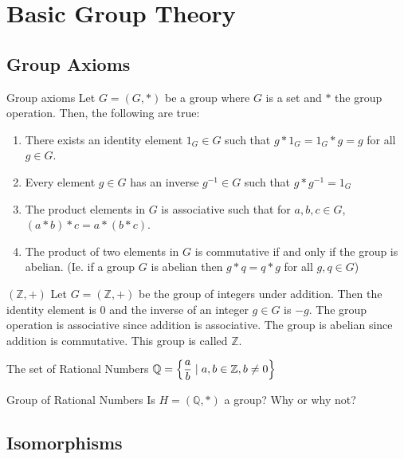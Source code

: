 \section{Basic Group Theory}
\subsection{Group Axioms}
\begin{definition}{Group axioms}{}
	Let $G = (G, *)$ be a group where $G$ is a set and $*$ the group operation. Then, the following are true:
	\begin{enumerate}
		\item There exists an identity element $1_{G} \in G$ such that $g * 1_{G} = 1_{G} *g = g$ for all $g \in G$.
		\item Every element $g \in G$ has an inverse $g^{-1} \in G$ such that $g * g^{-1} = 1_{G}$
		\item The product elements in $G$ is associative such that for $a, b, c \in G$, $(a * b) * c = a * (b * c)$.
		\item The product of two elements in $G$ is commutative if and only if the group is abelian. (Ie. if a group $G$ is abelian then $g * q = q * g$ for all $g, q \in G$)
	\end{enumerate}
\end{definition}


\begin{example}{$(\mathbb{Z}, +)$}{}
	Let $G = (\mathbb{Z}, +)$ be the group of integers under addition. Then the identity element is $0$ and the inverse of an integer $g \in G$ is $-g$. The group operation is associative since addition is associative. The group is abelian since addition is commutative. This group is called $\mathbb{Z}$.
\end{example}

\begin{definition}{The set of Rational Numbers}{}
	$\displaystyle\mathbb{Q} = \left\{\frac{a}{b} \hspace{0.1cm} | \hspace{0.1cm} a, b \in \mathbb{Z}, b \neq 0\right\}$
\end{definition}

\begin{question}{Group of Rational Numbers}{}
	{Is $H = (\mathbb{Q}, *)$ a group?} Why or why not?
\end{question}

\subsection{Isomorphisms}
